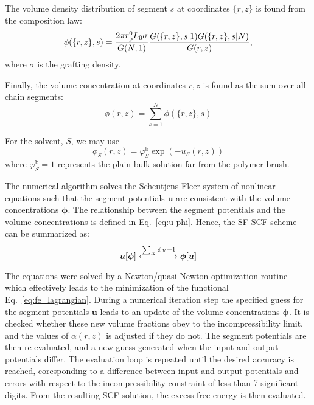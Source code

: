 \documentclass[10pt, a4paper, twocolumn]{article}
\begin{document}
The volume density distribution of segment $s$ at coordinates $\{r, z\}$ is found from the composition law:
\begin{equation}
    \label{eq:propagation}
    \phi(\{r, z\}, s) = \\
    \frac{2 \pi r_\text{p}^0 L_0 \sigma}{G(N,1)} \frac{G(\{r, z\}, s | 1) G(\{r, z\}, s | N)}{G(r, z)},
\end{equation}
where $\sigma$ is the grafting density.

Finally, the volume concentration at coordinates $r, z$ is found as the sum over all chain segments:
\begin{equation}
    \phi(r, z) = \sum_{s=1}^{N} \phi(\{r, z\}, s)
\end{equation}

For the solvent, $S$, we may use
\begin{equation}
    \phi_S(r,z) =\varphi_S^\text{b} \exp (-u_S(r,z))
\end{equation}
where $\varphi_S^\text{b} = 1$ represents the plain bulk solution far from the polymer brush. 

The numerical algorithm solves the Scheutjens-Fleer system of nonlinear equations such that the segment potentials $\bm{u}$ are consistent with the volume concentrations $\boldsymbol{\phi}$.
The relationship between the segment potentials and the volume concentrations is defined in Eq.~\eqref{eq:u-phi}.
Hence, the SF-SCF scheme can be summarized as:
\begin{equation}
    \boldsymbol{u}[\boldsymbol{\phi}] \xleftrightarrow[]{\sum_{X} \phi_X = 1} \boldsymbol{\phi}[\boldsymbol{u}]
\end{equation}

The equations were solved by a Newton/quasi-Newton optimization routine which effectively leads to the minimization of the functional Eq.~\eqref{eq:fe_lagrangian}.
During a numerical iteration step the specified guess for the segment potentials $\bm{u}$ leads to an update of the volume concentrations $\bm{\phi}$.
It is checked whether these new volume fractions obey to the incompressibility limit, and the values of $\alpha(r, z)$ is adjusted if they do not.
The segment potentials are then re-evaluated, and a new guess generated when the input and output potentials differ.
The evaluation loop is repeated until the desired accuracy is reached, coresponding to a difference between input and output potentials and errors with respect to the incompressibility constraint of less than 7 significant digits.
From the resulting SCF solution, the excess free energy is then evaluated.
\end{document}
